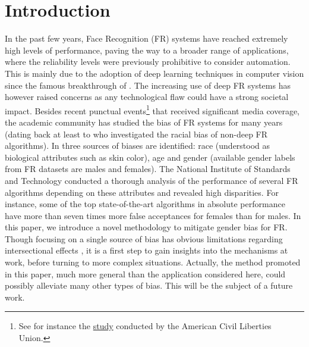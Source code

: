\documentclass[nohyperref]{article}
\theoremstyle{plain}
\theoremstyle{definition}
\theoremstyle{remark}
\begin{document}
\section{Introduction}














In the past few years, Face Recognition (FR) systems have reached extremely high levels of performance, paving the way to a broader range of applications, where the reliability levels were previously prohibitive to consider automation. This is mainly due to the adoption of deep learning techniques in computer vision since the famous breakthrough of \cite{krizhevsky2012imagenet}. The increasing use of deep FR systems has however raised concerns as any technological flaw could have a strong societal impact. Besides recent punctual events\footnote{See for instance the \href{https://www.aclu.org/blog/privacy-technology/surveillance-technologies/amazons-face-recognition-falsely-matched-28}{study} conducted by the American Civil Liberties Union.} that received significant media coverage, the academic community has studied the bias of FR systems for many years (dating back at least to \cite{nist_report_2002} who investigated the racial bias of non-deep FR algorithms). In \cite{bias_old_effects} three sources of biases are identified: race (understood as biological attributes such as skin color), age and gender (available gender labels from FR datasets are males and females). The National Institute of Standards and Technology \cite{nist_report_2019} conducted a thorough analysis of the performance of several FR algorithms depending on these attributes and revealed high disparities. For instance, some of the top state-of-the-art algorithms in absolute performance have more than seven times more false acceptances for females than for males. In this paper, we introduce a novel methodology to mitigate gender bias for FR. Though focusing on a single source of bias has obvious limitations regarding intersectional effects \cite{gender_shades}, it is a first step to gain insights into the mechanisms at work, before turning to more complex situations. Actually, the method promoted in this paper, much more general than the application considered here, could possibly alleviate many other types of bias. This will be the subject of a future work.
\end{document}
